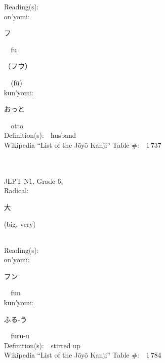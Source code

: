 \begin{multicols}{2}
Reading(s):\ \ \\
{\hspace*{1em}}on'yomi:\ \ \\
{\hspace*{2em}}{\begin{CJK}{UTF8}{min} フ \end{CJK}}\ \ fu\ \ \\
{\hspace*{2em}}{\begin{CJK}{UTF8}{min} （フウ） \end{CJK}}\ \ (f\=u)\ \ \\
{\hspace*{1em}}kun'yomi:\ \ \\
{\hspace*{2em}}{\begin{CJK}{UTF8}{min} おっと \end{CJK}}\ \ otto\ \ \\
Definition(s):\ \ husband \\
Wikipedia ``List of the J\=oy\=o Kanji'' Table \#:\ \ 1\,737 \\
\ \ \\
{\fontsize{34pt}{40pt}  }\ \ \\  %
{JLPT N1, Grade 6, \\Radical:\ \ {\begin{CJK}{UTF8}{min} 大 \end{CJK}} (big, very) } \\
Reading(s):\ \ \\
{\hspace*{1em}}on'yomi:\ \ \\
{\hspace*{2em}}{\begin{CJK}{UTF8}{min} フン \end{CJK}}\ \ fun\ \ \\
{\hspace*{1em}}kun'yomi:\ \ \\
{\hspace*{2em}}{\begin{CJK}{UTF8}{min} ふる-う \end{CJK}}\ \ furu-u\ \ \\
Definition(s):\ \ stirred up \\
Wikipedia ``List of the J\=oy\=o Kanji'' Table \#:\ \ 1\,784 \\
\ \ \\
\end{multicols}


